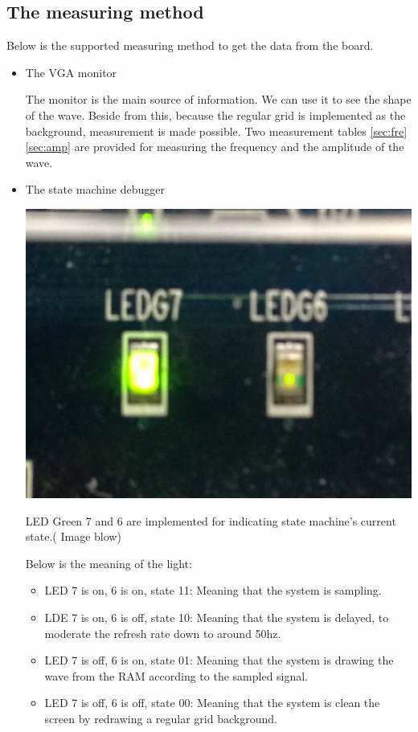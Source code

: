 \documentclass[11pt]{scrartcl}
\begin{document}
\subsection{The measuring method}
Below is the supported measuring method to get the data from the board.
\begin{itemize}
    \item The VGA monitor
    
    The monitor is the main source of information. We can use it to see the shape of the wave. Beside from this, because the regular grid is implemented as the background, measurement is made possible. Two measurement tables \ref{sec:fre} \ref{sec:amp} are provided for measuring the frequency and the amplitude of the wave. 
    \item The state machine debugger
    \begin{center}     
\begin{minipage}[t]{\linewidth}

{
\includegraphics[scale = 0.05]{IMG_1386.JPG}
}
\end{minipage}
\medskip
\end{center}

     LED Green 7 and 6 are implemented for indicating state machine's current state.( Image blow)

    
    Below is the meaning of the light:
    \begin{itemize}
        \item LED 7 is on, 6 is on, state 11:
         Meaning that the system is sampling.
         \item LDE 7 is on, 6 is off, state 10:
         Meaning that the system is delayed, to moderate the refresh rate down to around 50hz.
         \item LED 7 is off, 6 is on, state 01:
         Meaning that the system is drawing the wave from the RAM according to the sampled signal.
         \item LED 7 is off, 6 is off, state 00:
         Meaning that the system is clean the screen by redrawing a regular grid background.
         

\end{itemize}
\end{itemize}
\end{document}
